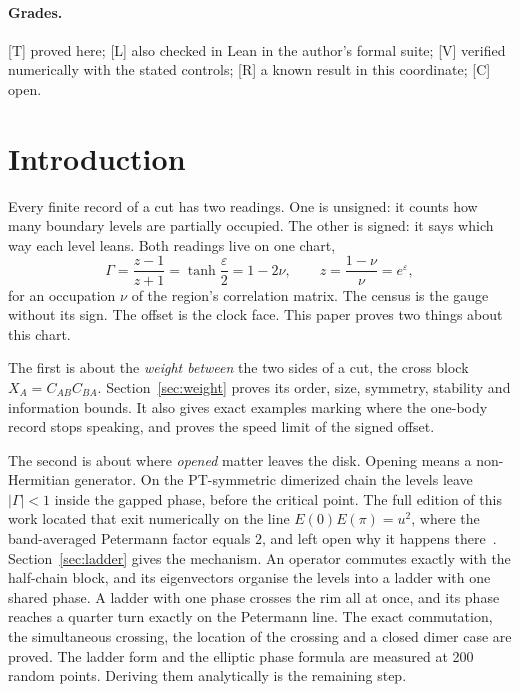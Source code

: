 \documentclass[11pt]{article}
\theoremstyle{definition}
\newcommand{\grade}[1]{\textsf{\small[#1]}}
\begin{document}
\paragraph{Grades.} \grade{T} proved here; \grade{L} also checked in Lean in the author's formal suite; \grade{V} verified numerically with the stated controls; \grade{R} a known result in this coordinate; \grade{C} open.

\section{Introduction}
Every finite record of a cut has two readings. One is unsigned: it counts how many boundary levels are partially occupied. The other is signed: it says which way each level leans. Both readings live on one chart,
\[
\Gamma=\frac{z-1}{z+1}=\tanh\frac{\varepsilon}{2}=1-2\nu,\qquad z=\frac{1-\nu}{\nu}=e^{\varepsilon},
\]
for an occupation $\nu$ of the region's correlation matrix. The census is the gauge without its sign. The offset is the clock face. This paper proves two things about this chart.

The first is about the \emph{weight between} the two sides of a cut, the cross block $X_A=C_{AB}C_{BA}$. Section~\ref{sec:weight} proves its order, size, symmetry, stability and information bounds. It also gives exact examples marking where the one-body record stops speaking, and proves the speed limit of the signed offset.

The second is about where \emph{opened} matter leaves the disk. Opening means a non-Hermitian generator. On the PT-symmetric dimerized chain the levels leave $|\Gamma|<1$ inside the gapped phase, before the critical point. The full edition of this work located that exit numerically on the line $E(0)E(\pi)=u^2$, where the band-averaged Petermann factor equals $2$, and left open why it happens there~\cite{matter4}. Section~\ref{sec:ladder} gives the mechanism. An operator commutes exactly with the half-chain block, and its eigenvectors organise the levels into a ladder with one shared phase. A ladder with one phase crosses the rim all at once, and its phase reaches a quarter turn exactly on the Petermann line. The exact commutation, the simultaneous crossing, the location of the crossing and a closed dimer case are proved. The ladder form and the elliptic phase formula are measured at 200 random points. Deriving them analytically is the remaining step.
\end{document}
